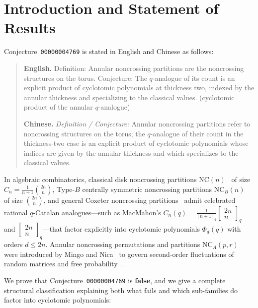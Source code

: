 \documentclass[11pt,a4paper]{article}
\theoremstyle{definition}
\theoremstyle{remark}
\newcommand{\NCA}{\mathrm{NC}_A}
\newcommand{\NC}{\mathrm{NC}}
\newcommand{\qbinom}[2]{\begin{bmatrix} #1 \\ #2 \end{bmatrix}_q}
\begin{document}
\section{Introduction and Statement of Results}

Conjecture~\texttt{00000004769} is stated in English and Chinese as follows:
\begin{quote}
\textbf{English.} Definition: Annular noncrossing partitions are the noncrossing structures on the torus. Conjecture: The $q$-analogue of its count is an explicit product of cyclotomic polynomials at thickness two, indexed by the annular thickness and specializing to the classical values. (cyclotomic product of the annular $q$-analogue)

\smallskip
\textbf{Chinese.} \emph{Definition / Conjecture:} Annular noncrossing partitions refer to noncrossing structures on the torus; the $q$-analogue of their count in the thickness-two case is an explicit product of cyclotomic polynomials whose indices are given by the annular thickness and which specializes to the classical values.
\end{quote}

In algebraic combinatorics, classical disk noncrossing partitions $\NC(n)$~\cite{Kreweras1972} of size $C_n = \frac{1}{n+1}\binom{2n}{n}$, Type-$B$ centrally symmetric noncrossing partitions $\NC_B(n)$~\cite{Reiner1997} of size $\binom{2n}{n}$, and general Coxeter noncrossing partitions~\cite{BessisReiner2011} admit celebrated rational $q$-Catalan analogues---such as MacMahon's $C_n(q) = \frac{1}{[n+1]_q}\qbinom{2n}{n}$ and $\qbinom{2n}{n}$---that factor explicitly into cyclotomic polynomials $\Phi_d(q)$ with orders $d \le 2n$. Annular noncrossing permutations and partitions $\NCA(p,r)$ were introduced by Mingo and Nica~\cite{MingoNica2004} to govern second-order fluctuations of random matrices and free probability~\cite{NicaSpeicher2006,GouldenNicaOancea2011,Kim2011}.

We prove that Conjecture~\texttt{00000004769} is \textbf{false}, and we give a complete structural classification explaining both what fails and which sub-families do factor into cyclotomic polynomials:
\end{document}

